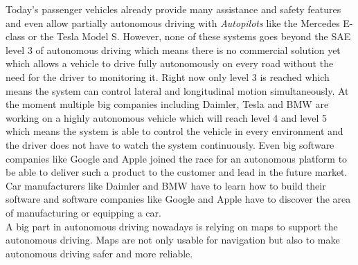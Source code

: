 Today's passenger vehicles already provide many assistance and safety features and even allow partially autonomous driving with \emph{Autopilots} like the Mercedes E-class or the Tesla Model S. However, none of these systems goes beyond the SAE level 3 of autonomous driving \cite{sae} which means there is no commercial solution yet which allows a vehicle to drive fully autonomously on every road without the need for the driver to monitoring it. Right now only level 3 is reached which means the system can control lateral and longitudinal motion simultaneously. At the moment multiple big companies including Daimler, Tesla and BMW are working on a highly autonomous vehicle which will reach level 4 and level 5 which means the system is able to control the vehicle in every environment and the driver does not have to watch the system continuously. Even big software companies like Google and Apple joined the race for an autonomous platform to be able to deliver such a product to the customer and lead in the future market. Car manufacturers like Daimler and BMW have to learn how to build their software and software companies like Google and Apple have to discover the area of manufacturing or equipping a car.\\
A big part in autonomous driving nowadays is relying on maps to support the autonomous driving. Maps are not only usable for navigation but also to make autonomous driving safer and more reliable.
